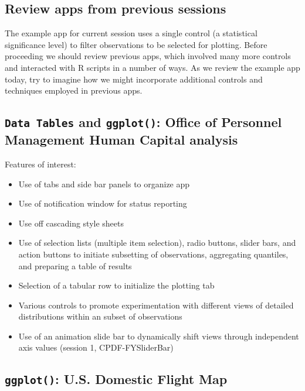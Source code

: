 \documentclass[10pt, letterpaper]{article}
\begin{document}
\begin{spacing}{1.0}

\section{Review apps from previous sessions}\label{sec:prevapps}

The example app for current session uses a single control (a statistical significance level) to filter observations to be selected for plotting.  Before proceeding we should review previous apps, which involved many more controls and interacted with R scripts in a number of ways.  As we review the example app today, try to imagine how we might incorporate additional controls and techniques employed in previous apps. 

\subsection{\texttt{Data Tables} and \texttt{ggplot()}: Office of Personnel Management Human Capital analysis}\label{sec:prevappOPM}

Features of interest:

\begin{itemize}[noitemsep]
    \item Use of tabs and side bar panels to organize app
    \item Use of notification window for status reporting
    \item Use off cascading style sheets
    \item Use of selection lists (multiple item selection), radio buttons, slider bars, and action buttons to initiate subsetting of observations, aggregating quantiles, and preparing a table of results
    \item Selection of a tabular row to initialize the plotting tab
    \item Various controls to promote experimentation with different views of detailed distributions within an subset of observations
    \item Use of an animation slide bar to dynamically shift views through independent axis values (session 1, CPDF-FYSliderBar)
\end{itemize}

\subsection{\texttt{ggplot()}: U.S. Domestic Flight Map}\label{sec:prevappfltmap}


\end{spacing}
\end{document}
